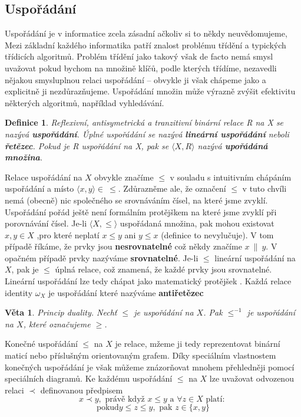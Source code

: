 \documentclass[12pt,a4paper]{article}
\newtheorem{definition}{Definice}
\newtheorem{sentence}{Věta}
\begin{document}
\subsection{Uspořádání}
Uspořádání je v informatice zcela zásadní ačkoliv si to někdy neuvědomujeme, Mezi základní každého informatika patří znalost problému třídění a typických třídicích algoritmů. Problém třídění jako takový však de facto nemá smysl uvažovat pokud bychom na množině klíčů, podle kterých třídíme, nezavedli nějakou smysluplnou relaci uspořádání -- obvykle ji však chápeme jako  a explicitně ji nezdůrazňujeme. Uspořádání množin může výrazně zvýšit efektivitu některých algoritmů, například vyhledávání.

\begin{definition}
	Reflexivní, antisymetrická a tranzitivní binární relace R na X se nazývá \textbf{uspořádání}. Úplné uspořádání se nazývá \textbf{lineární uspořádání} neboli \textbf{řetězec}. Pokud je R uspořádání na X, pak se $\langle X, R \rangle$ nazývá \textbf{upořádáná množina}.
\end{definition}

Relace uspořádání na $X$ obvykle značíme $\leq$ v souladu s intuitivním chápáním uspořádání a místo $\langle x ,y \rangle \in \ \leq$. Zdůrazněme ale, že označení $\leq$ v tuto chvíli nemá (obecně) nic společného se srovnáváním čísel, na které jsme zvyklí. Uspořádání pořád ještě není formálním protějškem  na které jsme zvyklí při porovnávání čísel. Je-li $\langle X, \leq \rangle$ uspořádaná množina, pak mohou  existovat $x,y \in X$ ,pro které neplatí $x \leq y$ ani $y \leq x$ (definice to nevylučuje). V tom případě říkáme, že prvky jsou \textbf{nesrovnatelné} což někdy značíme $x\ \| \ y$. V opačném případě prvky nazýváme \textbf{srovnatelné}. Je-li $\leq$ lineární uspořádání na $X$, pak je $\leq$ úplná relace, což znamená, že každé prvky jsou srovnatelné. Lineární uspořádání lze tedy chápat jako matematický protějšek . Každá relace identity $\omega_X$ je uspořádání které nazýváme \textbf{antiřetězec}

\begin{sentence}
	Princip duality. Nechť $\leq$ je uspořádání na $X$. Pak $\leq^{-1}$ je uspořádání na $X$, které označujeme $\geq$.
\end{sentence}

Konečné uspořádání $\leq$ na $X$ je relace, mžeme ji tedy reprezentovat binární maticí nebo příslušným orientovaným grafem. Díky speciálním vlastnostem konečných uspořádání je však můžeme znázorňovat mnohem přehledněji pomocí speciálních diagramů. Ke každému uspořádání $\leq$ na $X$ lze uvažovat odvozenou relaci $\prec$ definovanou předpisem
$$x \prec y, \text{ právě když } x \leq y \text{ a } \forall z \in X \text{ platí: }$$
$$\text{pokud} y \leq z \leq y, \text{ pak } z \in \{ x, y\}$$
\end{document}
